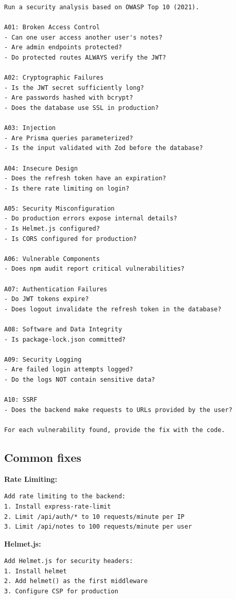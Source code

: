 \begin{praticabox}[title={Practice --- OWASP audit}]
\begin{lstlisting}[language={}]
Run a security analysis based on OWASP Top 10 (2021).

A01: Broken Access Control
- Can one user access another user's notes?
- Are admin endpoints protected?
- Do protected routes ALWAYS verify the JWT?

A02: Cryptographic Failures
- Is the JWT secret sufficiently long?
- Are passwords hashed with bcrypt?
- Does the database use SSL in production?

A03: Injection
- Are Prisma queries parameterized?
- Is the input validated with Zod before the database?

A04: Insecure Design
- Does the refresh token have an expiration?
- Is there rate limiting on login?

A05: Security Misconfiguration
- Do production errors expose internal details?
- Is Helmet.js configured?
- Is CORS configured for production?

A06: Vulnerable Components
- Does npm audit report critical vulnerabilities?

A07: Authentication Failures
- Do JWT tokens expire?
- Does logout invalidate the refresh token in the database?

A08: Software and Data Integrity
- Is package-lock.json committed?

A09: Security Logging
- Are failed login attempts logged?
- Do the logs NOT contain sensitive data?

A10: SSRF
- Does the backend make requests to URLs provided by the user?

For each vulnerability found, provide the fix with the code.
\end{lstlisting}
\end{praticabox}

\subsection{Common fixes}

\textbf{Rate Limiting:}
\begin{lstlisting}[language={}]
Add rate limiting to the backend:
1. Install express-rate-limit
2. Limit /api/auth/* to 10 requests/minute per IP
3. Limit /api/notes to 100 requests/minute per user
\end{lstlisting}

\textbf{Helmet.js:}
\begin{lstlisting}[language={}]
Add Helmet.js for security headers:
1. Install helmet
2. Add helmet() as the first middleware
3. Configure CSP for production
\end{lstlisting}

